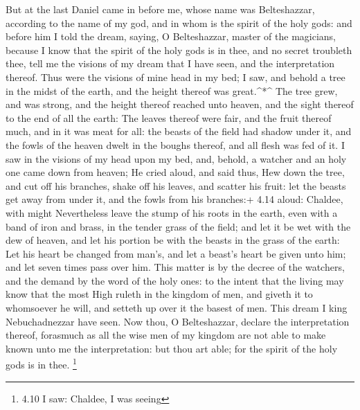  But at the last Daniel came in before me, whose name was
Belteshazzar, according to the name of my god, and in whom is the spirit
of the holy gods: and before him I told the dream, saying, 
O Belteshazzar, master of the magicians, because I know that the spirit
of the holy gods is in thee, and no secret troubleth thee, tell me the
visions of my dream that I have seen, and the interpretation thereof.
 Thus were the visions of mine head in my bed; I saw, and
behold a tree in the midst of the earth, and the height thereof was
great.\^{}*\^{}  The tree grew, and was strong, and the
height thereof reached unto heaven, and the sight thereof to the end of
all the earth:  The leaves thereof were fair, and the fruit
thereof much, and in it was meat for all: the beasts of the field had
shadow under it, and the fowls of the heaven dwelt in the boughs
thereof, and all flesh was fed of it.  I saw in the visions
of my head upon my bed, and, behold, a watcher and an holy one came down
from heaven;  He cried aloud, and said thus, Hew down the
tree, and cut off his branches, shake off his leaves, and scatter his
fruit: let the beasts get away from under it, and the fowls from his
branches:+ 4.14 aloud: Chaldee, with might  Nevertheless
leave the stump of his roots in the earth, even with a band of iron and
brass, in the tender grass of the field; and let it be wet with the dew
of heaven, and let his portion be with the beasts in the grass of the
earth:  Let his heart be changed from man's, and let a
beast's heart be given unto him; and let seven times pass over him.
 This matter is by the decree of the watchers, and the
demand by the word of the holy ones: to the intent that the living may
know that the most High ruleth in the kingdom of men, and giveth it to
whomsoever he will, and setteth up over it the basest of men.
 This dream I king Nebuchadnezzar have seen. Now thou, O
Belteshazzar, declare the interpretation thereof, forasmuch as all the
wise men of my kingdom are not able to make known unto me the
interpretation: but thou art able; for the spirit of the holy gods is in
thee. \footnote{4.10 I saw: Chaldee, I was seeing}


